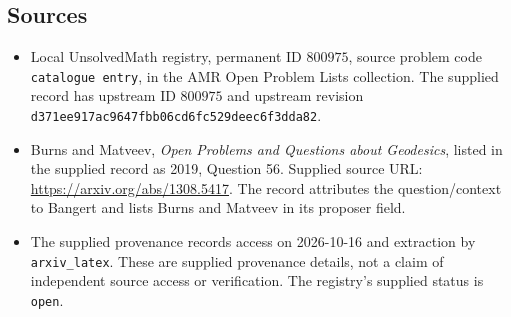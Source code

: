 \documentclass[11pt]{article}
\begin{document}
\subsection{Sources}
\begin{itemize}
\item Local UnsolvedMath registry, permanent ID \(800975\), source problem code \texttt{catalogue entry}, in the AMR Open Problem Lists collection. The supplied record has upstream ID \(800975\) and upstream revision \texttt{d371ee917ac9647fbb06cd6fc529deec6f3dda82}.
\item Burns and Matveev, \emph{Open Problems and Questions about Geodesics}, listed in the supplied record as 2019, Question 56. Supplied source URL: \url{https://arxiv.org/abs/1308.5417}. The record attributes the question/context to Bangert and lists Burns and Matveev in its proposer field.
\item The supplied provenance records access on 2026-10-16 and extraction by \texttt{arxiv\_latex}. These are supplied provenance details, not a claim of independent source access or verification. The registry's supplied status is \texttt{open}.
\end{itemize}
\end{document}
